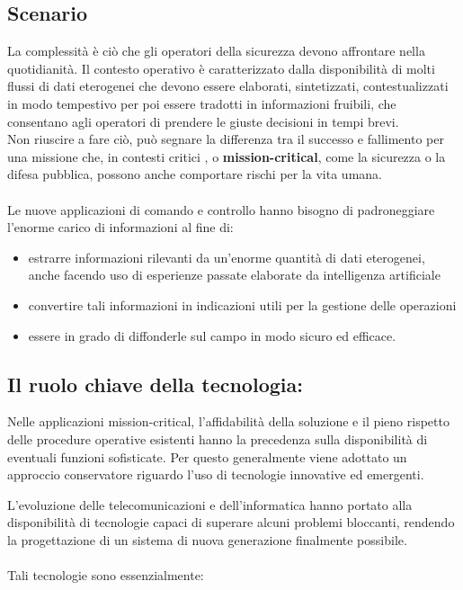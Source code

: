 \subsection{Scenario}
La complessità è ciò che gli operatori della sicurezza devono affrontare nella quotidianità.
Il contesto operativo è caratterizzato dalla disponibilità di
molti flussi di dati eterogenei che devono essere elaborati,
sintetizzati, contestualizzati in modo tempestivo per poi essere
tradotti in informazioni fruibili, che consentano agli operatori di
prendere le giuste decisioni in tempi brevi.\\
Non riuscire a fare ciò, può segnare la differenza tra il successo
e fallimento per una missione che, in contesti critici , o \textbf{mission-critical}, come
la sicurezza o la difesa pubblica, possono anche comportare rischi per la vita umana.
\\\\
Le nuove applicazioni di comando e controllo hanno bisogno di padroneggiare l'enorme carico di informazioni
al fine di:
\begin{itemize}
    \item estrarre informazioni rilevanti da un'enorme quantità di
    dati eterogenei, anche facendo uso di esperienze passate elaborate da intelligenza artificiale
    \item convertire tali informazioni in indicazioni utili per la gestione delle operazioni
    \item essere in grado di diffonderle sul campo in modo sicuro ed efficace.
\end{itemize}

\subsection{Il ruolo chiave della tecnologia:}
Nelle applicazioni mission-critical, l'affidabilità
della soluzione e il pieno rispetto delle 
procedure operative esistenti hanno la precedenza
sulla disponibilità di eventuali funzioni sofisticate. 
Per questo generalmente viene adottato un approccio conservatore
 riguardo l'uso di tecnologie innovative ed emergenti.

L'evoluzione delle telecomunicazioni e dell'informatica 
hanno portato alla disponibilità di tecnologie capaci
di superare alcuni problemi bloccanti, rendendo la
progettazione di un sistema di nuova generazione finalmente possibile.
\\\\
Tali tecnologie sono essenzialmente:

